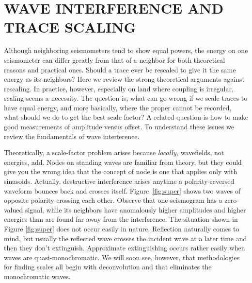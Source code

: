 \section{WAVE INTERFERENCE AND TRACE SCALING}
Although neighboring seismometers tend to show equal powers,
the energy on one seismometer can differ greatly
from that of a neighbor for both theoretical reasons
and practical ones.
Should a trace ever be rescaled
to give it the same energy as its neighbors?
Here we review the strong theoretical arguments against rescaling.
In practice,
however, especially on land where coupling is irregular,
scaling seems a necessity.
The question is,
what can go wrong if we scale traces to have equal energy,
and more basically,
where the proper  cannot be recorded,
what should we do to get the best scale factor?
A related question is how to make good measurements of amplitude versus offset.
To understand these issues we review
the fundamentals of wave interference.


\par
Theoretically, a scale-factor problem arises
because {\it locally,} wavefields, not energies, add.
Nodes on standing waves are familiar from theory,
but they could give you the wrong idea that the concept of node
is one that applies only with sinusoids.
Actually, destructive interference arises 
anytime a polarity-reversed waveform bounces back and crosses itself.
Figure~\ref{fig:super} shows two waves of opposite polarity crossing each other.
Observe that one seismogram has a zero-valued signal,
while its neighbors have anomalously higher amplitudes
and higher energies than are found far away from the interference.
The situation shown in Figure \ref{fig:super} does not occur easily in nature.
Reflection naturally comes to mind,
but usually the reflected wave
crosses the incident wave at a later time and then they don't extinguish.
Approximate extinguishing occurs rather easily 
when waves are quasi-monochromatic.
We will soon see, however,
that methodologies for finding scales all begin with deconvolution
and that eliminates the monochromatic waves.

